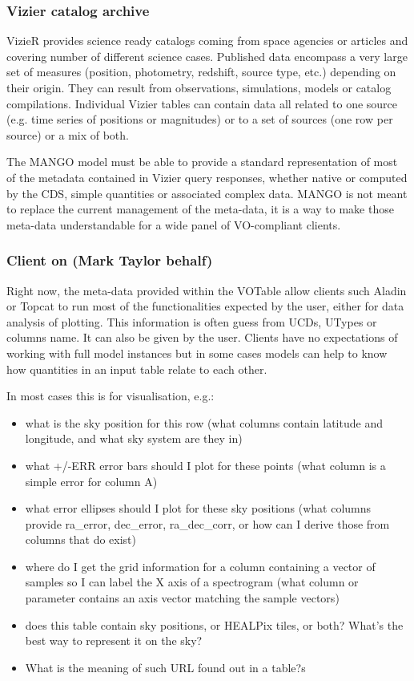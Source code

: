 \documentclass[11pt,a4paper]{ivoa}
\begin{document}
\subsubsection{Vizier catalog archive}
VizieR provides science ready catalogs coming from space agencies or articles and covering number of
different science cases.
Published data encompass a very large set of measures (position, photometry, redshift, source type, etc.)
depending on their origin.
They can result from  observations, simulations, models or catalog compilations.
Individual Vizier tables can contain data all related to one source (e.g. time series of positions or magnitudes) or to a set of sources (one row per source) or a mix of both.

The MANGO model must be able to provide a standard representation of most of the metadata contained 
in Vizier query responses, whether native or computed  by the CDS,
simple quantities or associated complex data.
MANGO is not meant to replace the current management of the meta-data,
it is a way to make those meta-data understandable for a wide panel of VO-compliant clients.

\subsubsection{Client on (Mark Taylor behalf)}
Right now, the meta-data provided within the VOTable allow clients such Aladin or Topcat to run most 
of the functionalities expected by the user, either for data analysis of plotting.
This information is often guess from UCDs, UTypes or columns name. It can also be given by the user.
Clients have no expectations of working with full model instances but in some cases models 
can help to know how quantities in an input table relate to each other.

In most cases this is for visualisation, e.g.:
\begin{itemize}
    \item what is the sky position for this row
    (what columns contain latitude and longitude, and what sky system are they in)

     \item what +/-ERR error bars should I plot for these points
    (what column is a simple error for column A)

    \item what error ellipses should I plot for these sky positions
    (what columns provide ra\_error, dec\_error, ra\_dec\_corr,
     or how can I derive those from columns that do exist)

    \item where do I get the grid information for a column containing
    a vector of samples so I can label the X axis of a spectrogram
    (what column or parameter contains an axis vector matching
     the sample vectors)

    \item does this table contain sky positions, or HEALPix tiles, or both?
    What's the best way to represent it on the sky?

    \item What is the meaning of such URL found out in a table?s
\end{itemize}
\end{document}
